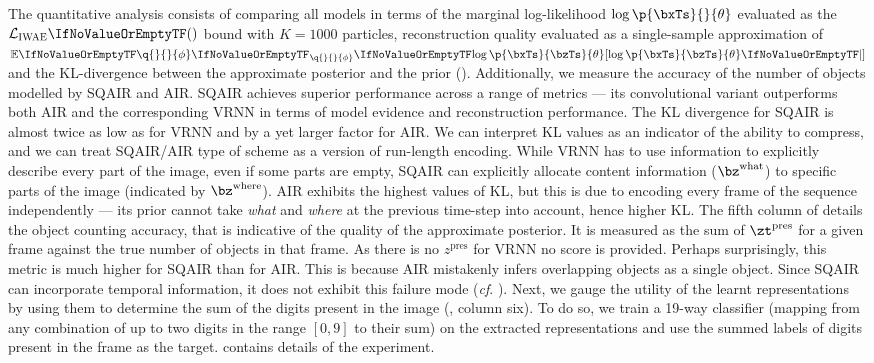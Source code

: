 The quantitative analysis consists of comparing all models in terms of the marginal log-likelihood $\log \p{\bxTs}{}{\theta}$ evaluated as the $\loss[\textsc{IWAE}]$ bound with $K=1000$ particles, reconstruction quality evaluated as a single-sample approximation of $\expc[\q{}{}{\phi}]{\log \p{\bxTs}{\bzTs}{\theta}}$ and the \gls{KL}-divergence between the approximate posterior and the prior (). Additionally, we measure the accuracy of the number of objects modelled by \gls{SQAIR} and \gls{AIR}. \Gls{SQAIR} achieves superior performance across a range of metrics --- its convolutional variant outperforms both \gls{AIR} and the corresponding \gls{VRNN} in terms of model evidence and reconstruction performance. 
The \gls{KL} divergence for \gls{SQAIR} is almost twice as low as for \gls{VRNN} and by a yet larger factor for \gls{AIR}.
We can interpret \gls{KL} values as an indicator of the ability to compress, and we can treat \gls{SQAIR}/\gls{AIR} type of scheme as a version of run-length encoding.
While \gls{VRNN} has to use information to explicitly describe every part of the image, even if some parts are empty, \gls{SQAIR} can explicitly allocate content information ($\bz^\mathrm{what}$) to specific parts of the image (indicated by $\bz^\mathrm{where}$).
\Gls{AIR} exhibits the highest values of \gls{KL}, but this is due to encoding every frame of the sequence independently --- its prior cannot take \textit{what} and \textit{where} at the previous time-step into account, hence higher KL.
The fifth column of  details the object counting accuracy, that is indicative of the quality of the approximate posterior. It is measured as the sum of $\zt^\mathrm{pres}$ for a given frame against the true number of objects in that frame. As there is no $z^\mathrm{pres}$ for \gls{VRNN} no score is provided. Perhaps surprisingly, this metric is much higher for \gls{SQAIR} than for \gls{AIR}. This is because \gls{AIR} mistakenly infers overlapping objects as a single object. Since \gls{SQAIR} can incorporate temporal information, it does not exhibit this failure mode (\textit{cf}. ).
Next, we gauge the utility of the learnt representations by using them to determine the sum of the digits present in the image (, column six). To do so, we train a 19-way classifier (mapping from any combination of up to two digits in the range $[0, 9]$ to their sum) on the extracted representations and use the summed labels of digits present in the frame as the target.  contains details of the experiment. 
